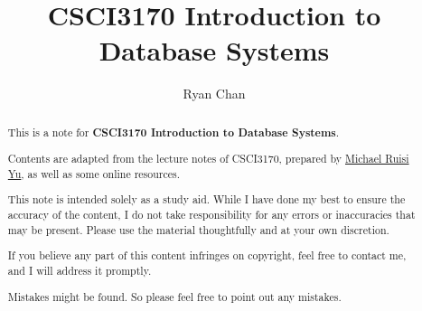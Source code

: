 \documentclass[a4paper]{report}
\author{Ryan Chan}
\title{CSCI3170 Introduction to Database Systems}
\begin{document}
\setlength\parindent{0pt}

\maketitle

\newpage

\begin{abstract}
	This is a note for \textbf{CSCI3170 Introduction to Database Systems}. 
	
	Contents are adapted from the lecture notes of CSCI3170, prepared by \href{https://www.cse.cuhk.edu.hk/people/faculty/michael-ruisi-yu/}{Michael Ruisi Yu}, as well as some online resources.
	
	This note is intended solely as a study aid. While I have done my best to ensure the accuracy of the content, I do not take responsibility for any errors or inaccuracies that may be present. Please use the material thoughtfully and at your own discretion.
	
	If you believe any part of this content infringes on copyright, feel free to contact me, and I will address it promptly.
	
	Mistakes might be found. So please feel free to point out any mistakes.
\end{abstract}

\newpage

\tableofcontents

\setlength{\parskip}{5pt}
\end{document}
